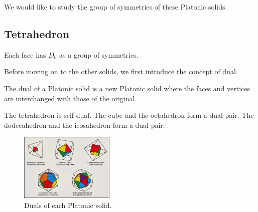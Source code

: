 \documentclass[../main.tex]{subfiles}
\begin{document}
We would like to study the group of symmetries of these Platonic solids.

\subsection{Tetrahedron}
Each face has $D_{6}$ as a group of symmetries.





Before moving on to the other solids, we first introduce the concept of dual.
\begin{definition}
   The dual of a Platonic solid is a new Platonic solid where the faces and vertices are interchanged with those of the original. 
\end{definition}
\begin{remark}
    The tetrahedron is self-dual. The cube and the octahedron form a dual pair. The dodecahedron and the icosahedron form a dual pair.
\end{remark}
\begin{figure}[ht]
    \centering
    \includegraphics[width=0.4\textwidth]{PlatonicSolidsDual.jpg}
    \caption{Duals of each Platonic solid.}
    \label{}
\end{figure}
\end{document}
